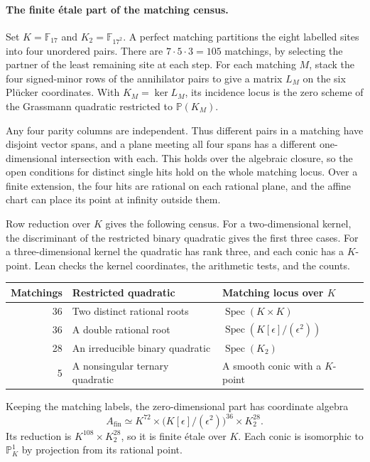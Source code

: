 \paragraph{The finite \texorpdfstring{\'etale}{etale} part of the matching census.}
Set \(K=\mathbb F_{17}\) and \(K_2=\mathbb F_{17^2}\). A perfect matching
partitions the eight labelled sites into four unordered pairs. There are
\(7\cdot5\cdot3=105\) matchings, by selecting the partner of the least
remaining site at each step. For each matching \(M\), stack the four
signed-minor rows of the annihilator pairs to give a matrix \(L_M\) on
the six Pl\"ucker coordinates. With \(K_M=\ker L_M\), its incidence locus
is the zero scheme of the Grassmann quadratic restricted to
\(\mathbb P(K_M)\).

Any four parity columns are independent. Thus different pairs in a
matching have disjoint vector spans, and a plane meeting all four spans
has a different one-dimensional intersection with each. This holds over
the algebraic closure, so the open conditions for distinct single hits
hold on the whole matching locus. Over a finite extension, the four hits
are rational on each rational plane, and the affine chart can place its
point at infinity outside them.

Row reduction over \(K\) gives the following census. For a two-dimensional
kernel, the discriminant of the restricted binary quadratic gives the
first three cases. For a three-dimensional kernel the quadratic has rank
three, and each conic has a \(K\)-point. Lean checks the kernel
coordinates, the arithmetic tests, and the counts.

\begin{center}
\small
\begin{tabular}{@{}rll@{}}
\toprule
Matchings & Restricted quadratic & Matching locus over \(K\)\\
\midrule
36 & Two distinct rational roots & \(\operatorname{Spec}(K\times K)\)\\
36 & A double rational root & \(\operatorname{Spec}(K[\epsilon]/(\epsilon^2))\)\\
28 & An irreducible binary quadratic & \(\operatorname{Spec}(K_2)\)\\
5  & A nonsingular ternary quadratic & A smooth conic with a \(K\)-point\\
\bottomrule
\end{tabular}
\end{center}

Keeping the matching labels, the zero-dimensional part has coordinate
algebra
\[
 A_{\mathrm{fin}}\simeq K^{72}\times
       \bigl(K[\epsilon]/(\epsilon^2)\bigr)^{36}\times K_2^{28}.
\]
Its reduction is \(K^{108}\times K_2^{28}\), so it is finite \'etale over
\(K\). Each conic is isomorphic to \(\mathbb P^1_K\) by projection from
its rational point.

